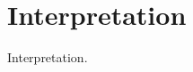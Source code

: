 \documentclass[Masterthesis.tex]{subfiles}
\begin{document}
\chapter{Interpretation}

Interpretation.
\end{document}
